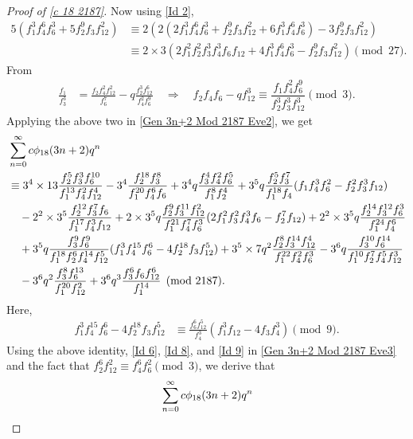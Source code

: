 \documentclass[12pt]{article}
\numberwithin{equation}{section}
\theoremstyle{plain}
\numberwithin{theorem}{section}
\theoremstyle{definition}
\theoremstyle{remark}
\begin{document}
\begin{proof}[Proof of \eqref{c 18 2187}]
Now using \eqref{Id 2},
\begin{align*}
    5\left(f_1^3 f_4^6 f_6^3+5f_2^9 f_3 f_{12}^2\right)&\equiv 2 (2(2f_1^3 f_4^6 f_6^3+f_2^9 f_3 f_{12}^2+6 f_1^3 f_4^6 f_6^3)-3f_2^9 f_3 f_{12}^2)\\
    &\equiv 2 \times 3(2f_1^2 f_2^2 f_3^3 f_4^3 f_6 f_{12}+4 f_1^3 f_4^6 f_6^3-f_2^9 f_3 f_{12}^2) \pmod{27}.
\end{align*}
From \cite{Hir17}
    \begin{align*}
        \frac{f_1}{f_3^3}&=\frac{f_2 f_4^2 f_{12}^2}{f_6^7}-q \frac{f_2^3 f_{12}^6}{f_4^2 f_6^9} \quad \Rightarrow \quad f_2 f_4 f_6-q f_{12}^3\equiv \dfrac{f_1f_4^2f_6^9}{f_2^3f_3^3f_{12}^
        3} \pmod{3}.
    \end{align*}
Applying the above two in \eqref{Gen 3n+2 Mod 2187 Eve2}, we get
    \begin{align}
        &\sum_{n=0}^\infty c\phi_{18}(3n+2)q^n\notag\\
        &\equiv 3^4\times 13\frac{f_2^5 f_3^3 f_6^{10}}{f_1^{13} f_4^2 f_{12}^4}-3^4 \frac{f_2^{18} f_3^8}{f_1^{20} f_4^6 f_6}+3^4 q \frac{f_3^4 f_4^2 f_6^5}{f_1^8 f_2^4}+3^5 q \frac{f_2^5 f_3^7}{f_1^{18} f_4}(f_1 f_4^3 f_6^2-f_2^2 f_3^3 f_{12})\notag\\
        &\quad -2^2\times  3^5\frac{f_2^{12} f_3^7 f_6}{f_1^{17} f_4^3 f_{12}}+ 2 \times 3^5 q \frac{f_2^9 f_3^{11} f_{12}^2}{f_1^{21} f_4^7 f_6^3}(2 f_1^2 f_3^2 f_4^3 f_6-f_2^7 f_{12})+2^2\times 3^5 q \frac{f_2^{14} f_3^{12} f_6^3}{f_1^{24} f_4^6}\notag\\
        &\quad+3^5 q\frac{f_3^9 f_6^9}{f_1^{18} f_2^6 f_4^{14} f_{12}^5}(f_1^3 f_4^{15} f_6^6-4 f_2^{18} f_3 f_{12}^5)+3^5 \times 7 q^2 \frac{f_2^8 f_3^{14} f_{12}^4}{f_1^{22} f_4^2 f_6^3}-3^6 q  \frac{f_3^{10} f_6^{14}}{f_1^{10} f_2^7 f_4^5 f_{12}^3}\notag\\
        &\quad -3^6 q^2\frac{f_3^8 f_6^{13}}{f_1^{20} f_{12}^2}+3^6 q^3 \frac{f_3^6 f_6 f_{12}^6}{f_1^{14}} \pmod{2187}. \label{Gen 3n+2 Mod 2187 Eve3}
    \end{align}
    Here, 
    \begin{align*}
        f_1^3 f_4^{15} f_6^6-4 f_2^{18} f_3 f_{12}^5&\equiv \frac{f_6^6 f_{12}^5}{f_4^3}(f_1^3 f_{12}-4 f_3 f_4^3)\pmod{9}.
    \end{align*}
    Using the above identity, \eqref{Id 6}, \eqref{Id 8}, and \eqref{Id 9} in \eqref{Gen 3n+2 Mod 2187 Eve3} and the fact that $f_2^6f_{12}^2 \equiv f_4^6 f_6^2 \pmod{3}$, we derive that
    \begin{align}
        &\sum_{n=0}^\infty c\phi_{18}(3n+2)q^n\notag\\

\end{align}
\end{proof}
\end{document}

